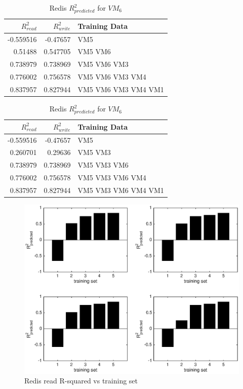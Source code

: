 \documentclass{acm_proc_article-sp}
\begin{document}
\begin{table}
\centering
\caption{Redis $R_{predicted}^2$ for $VM_6$}
\begin{tabular}{|r|r|l|} \hline
$R_{read}^2$&$R_{write}^2$&Training Data\\ \hline
-0.559516 & -0.47657 & VM5 \\ \hline 
0.51488 & 0.547705 & VM5 VM6 \\ \hline 
0.738979 & 0.738969 & VM5 VM6 VM3 \\ \hline 
0.776002 & 0.756578 & VM5 VM6 VM3 VM4 \\ \hline 
0.837957 & 0.827944 & VM5 VM6 VM3 VM4 VM1 \\ \hline 
\hline\end{tabular}
\label{table:redis}
\end{table}

\begin{table}
\centering
\caption{Redis $R_{predicted}^2$ for $VM_6$}
\begin{tabular}{|r|r|l|} \hline
$R_{read}^2$&$R_{write}^2$&Training Data\\ \hline
-0.559516 & -0.47657 & VM5 \\ \hline 
0.260701 & 0.29636 & VM5 VM3 \\ \hline 
0.738979 & 0.738969 & VM5 VM3 VM6 \\ \hline 
0.776002 & 0.756578 & VM5 VM3 VM6 VM4 \\ \hline 
0.837957 & 0.827944 & VM5 VM3 VM6 VM4 VM1 \\ \hline 
\hline\end{tabular}
\label{table:redis}
\end{table}


  \begin{figure}
    \centering
    \includegraphics[scale = 0.5]{bar_read_avg_latency.eps}
    \caption{Redis read R-squared vs training set}
    \label{figure:redisbarread}
  \end{figure}
\end{document}
